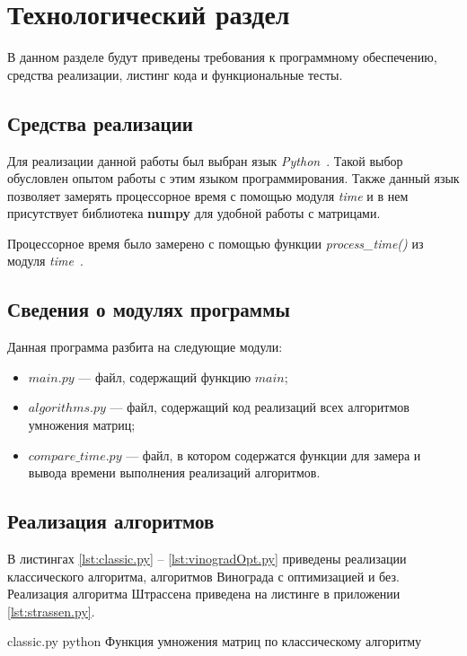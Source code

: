 \chapter{Технологический раздел}

В данном разделе будут приведены требования к программному обеспечению, средства реализации, листинг кода и функциональные тесты.


\section{Средства реализации}

Для реализации данной работы был выбран язык \textit{Python}~\cite{python}.
Такой выбор обусловлен опытом работы с этим языком программирования.
Также данный язык позволяет замерять процессорное время с помощью модуля \textit{time} и в нем присутствует библиотека \textbf{numpy} для удобной работы с матрицами. 

Процессорное время было замерено с помощью функции \textit{process\_time()} из модуля \textit{time}~\cite{python-time}.

\section{Сведения о модулях программы}

Данная программа разбита на следующие модули:
\begin{itemize}
	\item $main.py$ --- файл, содержащий функцию $main$;
	\item $algorithms.py$ --- файл, содержащий код реализаций всех алгоритмов умножения матриц;
	\item $compare\_time.py$ --- файл, в котором содержатся функции для замера и вывода времени выполнения реализаций алгоритмов.
\end{itemize}

\section{Реализация алгоритмов}

В листингах \ref{lst:classic.py} -- \ref{lst:vinogradOpt.py} приведены реализации классического алгоритма, алгоритмов Винограда с оптимизацией и без. Реализация алгоритма Штрассена приведена на листинге в приложении \ref{lst:strassen.py}.


\clearpage

{classic.py} %
{python} %
{Функция умножения матриц по классическому алгоритму} %

